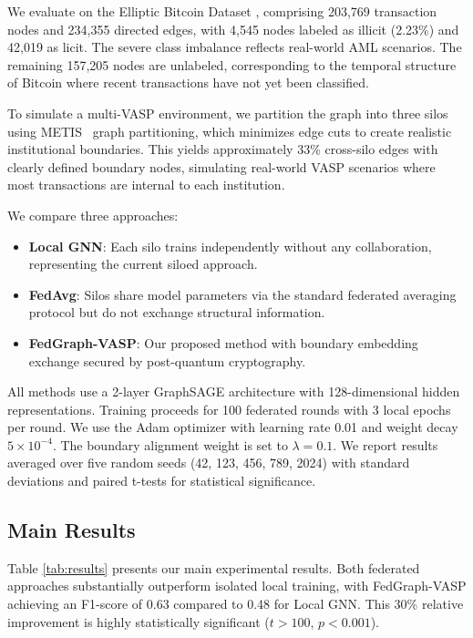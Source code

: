 \documentclass[conference]{IEEEtran}
\begin{document}
We evaluate on the Elliptic Bitcoin Dataset \cite{weber2019anti}, comprising 203,769 transaction nodes and 234,355 directed edges, with 4,545 nodes labeled as illicit (2.23\%) and 42,019 as licit. The severe class imbalance reflects real-world AML scenarios. The remaining 157,205 nodes are unlabeled, corresponding to the temporal structure of Bitcoin where recent transactions have not yet been classified.

To simulate a multi-VASP environment, we partition the graph into three silos using METIS~\cite{karypis1998fast} graph partitioning, which minimizes edge cuts to create realistic institutional boundaries. This yields approximately 33\% cross-silo edges with clearly defined boundary nodes, simulating real-world VASP scenarios where most transactions are internal to each institution.

We compare three approaches:
\begin{itemize}
    \item \textbf{Local GNN}: Each silo trains independently without any collaboration, representing the current siloed approach.
    \item \textbf{FedAvg}: Silos share model parameters via the standard federated averaging protocol but do not exchange structural information.
    \item \textbf{FedGraph-VASP}: Our proposed method with boundary embedding exchange secured by post-quantum cryptography.
\end{itemize}

All methods use a 2-layer GraphSAGE architecture with 128-dimensional hidden representations. Training proceeds for 100 federated rounds with 3 local epochs per round. We use the Adam optimizer with learning rate 0.01 and weight decay $5 \times 10^{-4}$. The boundary alignment weight is set to $\lambda = 0.1$. We report results averaged over five random seeds (42, 123, 456, 789, 2024) with standard deviations and paired t-tests for statistical significance.

\subsection{Main Results}

Table \ref{tab:results} presents our main experimental results. Both federated approaches substantially outperform isolated local training, with FedGraph-VASP achieving an F1-score of 0.63 compared to 0.48 for Local GNN. This 30\% relative improvement is highly statistically significant ($t > 100$, $p < 0.001$).
\end{document}
